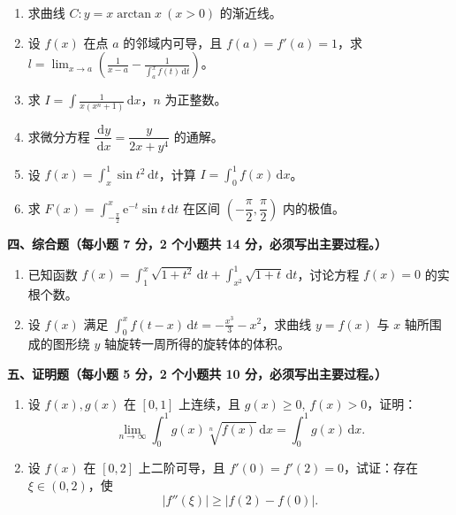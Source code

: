 \documentclass[a4paper,11pt]{ctexart}
\newcommand{\dd}{\,\mathrm{d}}
\newcommand{\e}{\mathrm{e}}
\begin{document}
\begin{enumerate}[label=\arabic*., start=11, leftmargin=2em, itemsep=0.75em, topsep=0.45em]
  \item 求曲线 $C: y=x\arctan x\ (x>0)$ 的渐近线。

  \item 设 $f(x)$ 在点 $a$ 的邻域内可导，且 $f(a)=f'(a)=1$，求 $l=\displaystyle\lim_{x\to a}\left(\frac{1}{x-a}-\frac{1}{\displaystyle\int_a^x f(t)\dd t}\right)$。

  \item 求 $I=\displaystyle\int\frac{1}{x(x^n+1)}\dd x$，$n$ 为正整数。

  \item 求微分方程 $\dfrac{\dd y}{\dd x}=\dfrac{y}{2x+y^4}$ 的通解。

  \item 设 $f(x)=\displaystyle\int_x^1 \sin t^2\dd t$，计算 $I=\displaystyle\int_0^1 f(x)\dd x$。

  \item 求 $F(x)=\displaystyle\int_{-\frac{\pi}{2}}^x \e^{-t}\sin t\dd t$ 在区间 $\left(-\dfrac{\pi}{2},\dfrac{\pi}{2}\right)$ 内的极值。
\end{enumerate}

\vspace{0.6em}

\textbf{四、综合题（每小题 7 分，2 个小题共 14 分，必须写出主要过程。）}

\begin{enumerate}[label=\arabic*., start=17, leftmargin=2em, itemsep=0.75em, topsep=0.45em]
  \item 已知函数 $f(x)=\displaystyle\int_1^x \sqrt{1+t^2}\dd t+\int_{x^2}^1 \sqrt{1+t}\dd t$，讨论方程 $f(x)=0$ 的实根个数。

  \item 设 $f(x)$ 满足 $\displaystyle\int_0^x f(t-x)\dd t=-\frac{x^3}{3}-x^2$，求曲线 $y=f(x)$ 与 $x$ 轴所围成的图形绕 $y$ 轴旋转一周所得的旋转体的体积。
\end{enumerate}

\vspace{0.6em}

\textbf{五、证明题（每小题 5 分，2 个小题共 10 分，必须写出主要过程。）}

\begin{enumerate}[label=\arabic*., start=19, leftmargin=2em, itemsep=0.75em, topsep=0.45em]
  \item 设 $f(x),g(x)$ 在 $[0,1]$ 上连续，且 $g(x)\ge 0,\,f(x)>0$，证明：
  \[
    \lim_{n\to\infty}\int_0^1 g(x)\sqrt[n]{f(x)}\dd x=\int_0^1 g(x)\dd x.
  \]

  \item 设 $f(x)$ 在 $[0,2]$ 上二阶可导，且 $f'(0)=f'(2)=0$，试证：存在 $\xi\in(0,2)$，使
  \[
    |f''(\xi)|\ge |f(2)-f(0)|.
  \]
\end{enumerate}
\end{document}

